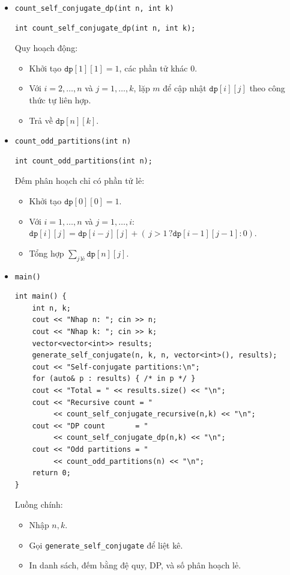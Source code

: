 \documentclass[a4paper,12pt]{article}
\begin{document}
\begin{itemize}
  \item \texttt{count\_self\_conjugate\_dp(int n, int k)}  
    \begin{lstlisting}[style=cppstyle]
int count_self_conjugate_dp(int n, int k);
    \end{lstlisting}
    Quy hoạch động:
    \begin{itemize}
      \item Khởi tạo \(\texttt{dp}[1][1]=1\), các phần tử khác 0.  
      \item Với \(i=2,\dots,n\) và \(j=1,\dots,k\), lặp \(m\) để cập nhật \(\texttt{dp}[i][j]\) theo công thức tự liên hợp.  
      \item Trả về \(\texttt{dp}[n][k]\).
    \end{itemize}

  \item \texttt{count\_odd\_partitions(int n)}  
    \begin{lstlisting}[style=cppstyle]
int count_odd_partitions(int n);
    \end{lstlisting}
    Đếm phân hoạch chỉ có phần tử lẻ:
    \begin{itemize}
      \item Khởi tạo \(\texttt{dp}[0][0]=1\).  
      \item Với \(i=1,\dots,n\) và \(j=1,\dots,i\):  
        \(\texttt{dp}[i][j] = \texttt{dp}[i-j][j] + (\,j>1\,?\texttt{dp}[i-1][j-1]:0)\).  
      \item Tổng hợp \(\sum_{j\,\text{lẻ}}\texttt{dp}[n][j]\).
    \end{itemize}

  \item \texttt{main()}  
    \begin{lstlisting}[style=cppstyle]
int main() {
    int n, k;
    cout << "Nhap n: "; cin >> n;
    cout << "Nhap k: "; cin >> k;
    vector<vector<int>> results;
    generate_self_conjugate(n, k, n, vector<int>(), results);
    cout << "Self-conjugate partitions:\n";
    for (auto& p : results) { /* in p */ }
    cout << "Total = " << results.size() << "\n";
    cout << "Recursive count = " 
         << count_self_conjugate_recursive(n,k) << "\n";
    cout << "DP count       = " 
         << count_self_conjugate_dp(n,k) << "\n";
    cout << "Odd partitions = " 
         << count_odd_partitions(n) << "\n";
    return 0;
}
    \end{lstlisting}
    Luồng chính:
    \begin{itemize}
      \item Nhập \(n, k\).  
      \item Gọi \texttt{generate\_self\_conjugate} để liệt kê.  
      \item In danh sách, đếm bằng đệ quy, DP, và số phân hoạch lẻ.
    \end{itemize}

\end{itemize}
\end{document}

